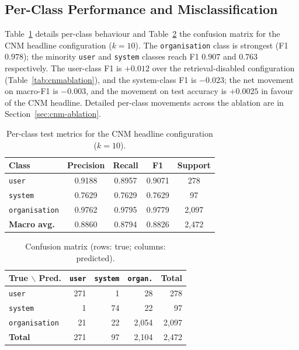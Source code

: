 \documentclass[final,3p,times,twocolumn]{elsarticle}
\begin{document}
	\subsection{Per-Class Performance and Misclassification}
	\label{sec:perclass} Table~\ref{tab:perclass} details per-class behaviour and
	Table~\ref{tab:confusion} the confusion matrix for the CNM headline
	configuration ($k = 10$). The \texttt{organisation} class is strongest (F1 $0.9
	78$); the minority \texttt{user} and \texttt{system} classes reach F1 $0.907$ and
	$0.763$ respectively. The user-class F1 is $+0.012$ over the retrieval-disabled
	configuration (Table~\ref{tab:cnmablation}), and the system-class F1 is $-0.023$;
	the net movement on macro-F1 is $-0.003$, and the movement on test accuracy is
	$+0.0025$ in favour of the CNM headline. Detailed per-class movements across
	the ablation are in Section~\ref{sec:cnm-ablation}.

	\begin{table}[h]
		\centering
		\caption{Per-class test metrics for the CNM headline configuration ($k = 10$).}
		\label{tab:perclass} 
        
        \footnotesize
		\begin{tabular}{@{}l cccc@{}}
			\toprule \textbf{Class}      & \textbf{Precision} & \textbf{Recall} & \textbf{F1} & \textbf{Support} \\
			\midrule \texttt{user}       & 0.9188             & 0.8957          & 0.9071      & 278              \\
			\texttt{system}              & 0.7629             & 0.7629          & 0.7629      & 97               \\
			\texttt{organisation}        & 0.9762             & 0.9795          & 0.9779      & 2{,}097          \\
			\midrule \textbf{Macro avg.} & 0.8860             & 0.8794          & 0.8826      & 2{,}472          \\
			\bottomrule
		\end{tabular}
	\end{table}

	\begin{table}[h]
		\centering
		\caption{Confusion matrix (rows: true; columns: predicted).}
		\label{tab:confusion} \footnotesize
		\setlength{\tabcolsep}{4pt}
		\begin{tabular}{@{}l rrr r@{}}
			\toprule \textbf{True $\backslash$ Pred.} & \texttt{user} & \texttt{system} & \texttt{organ.} & \textbf{Total} \\
			\midrule \texttt{user}                    & 271           & 1               & 28              & 278            \\
			\texttt{system}                           & 1             & 74              & 22              & 97             \\
			\texttt{organisation}                     & 21            & 22              & 2{,}054         & 2{,}097        \\
			\midrule \textbf{Total}                   & 271           & 97              & 2{,}104         & 2{,}472        \\
			\bottomrule
		\end{tabular}
	\end{table}
\end{document}
